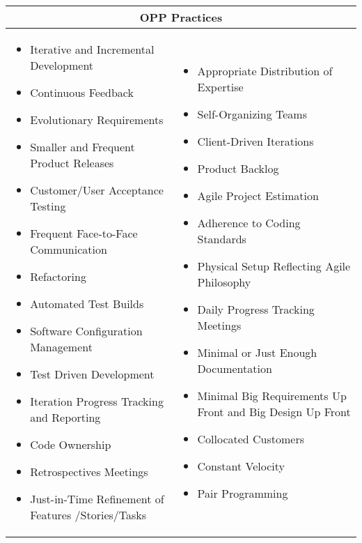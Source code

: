 \begin{table}
\begin{tabular}{| p{7.5cm}  p{7.5cm} |}
	\hline
	\multicolumn{2}{|c|}{\textbf{OPP Practices}}  \\ \hline
     	\begin{itemize}
     		\item Iterative and Incremental Development 
     		\item Continuous Feedback 
     		\item Evolutionary Requirements 
     		\item Smaller and Frequent Product Releases 
     		\item Customer/User Acceptance Testing 
     		\item Frequent Face-to-Face Communication
     		\item Refactoring 
     		\item Automated Test Builds
     		\item Software Configuration Management 
     		\item Test Driven Development
     		\item Iteration Progress Tracking and Reporting 
     		\item Code Ownership 
     		\item Retrospectives Meetings 
     		\item Just-in-Time Refinement of Features /Stories/Tasks 
     	\end{itemize} 
     	& \begin{itemize}
     	 	\item Appropriate Distribution of Expertise
  			\item Self-Organizing Teams
     		\item Client-Driven Iterations 
     		\item Product Backlog 
     		\item Agile Project Estimation 
     		\item Adherence to Coding Standards 
     		\item Physical Setup Reflecting Agile Philosophy
     		\item Daily Progress Tracking Meetings 
     		\item Minimal or Just Enough Documentation 
     		\item Minimal Big Requirements Up Front and Big Design Up Front 
     		\item Collocated Customers
     		\item Constant Velocity 
     		\item Pair Programming  
 		\end{itemize} 
     \\ \hline
\end{tabular}
\label{table:opp_practices}
\end{table}

